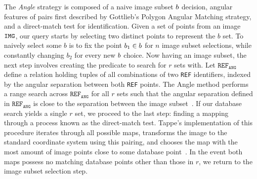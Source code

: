 The \textit{Angle} strategy is composed of a naive image subset $b$ decision, angular features of pairs first described by Gottlieb's Polygon Angular Matching strategy, and a direct-match test for identification.
Given a set of points from an image $\texttt{IMG}$, our query starts by selecting two distinct points to represent the $b$ set.
To naively select some $b$ is to fix the point $b_1 \in b$ for $n$ image subset selections, while constantly changing $b_2$ for every new $b$ choice.
Now having an image subset, the next step involves creating the predicate to search for $r$ sets with.
Let $\texttt{REF}_\texttt{ANG}$ define a relation holding tuples of all combinations of two \texttt{REF} identifiers, indexed by the angular separation between both \texttt{REF} points.
The Angle method performs a range search across $\texttt{REF}_\texttt{ANG}$ for all $r$ sets such that the angular separation defined in $\texttt{REF}_\texttt{ANG}$ is close to the separation between the image subset~\cite{bratt:analysisStarIdentification}.
If our database search yields a single $r$ set, we proceed to the last step: finding a mapping through a process known as the direct-match test.
Tappe's implementation of this procedure iterates through all possible maps, transforms the image to the standard coordinate system using this pairing, and chooses the map with the most amount of image points close to some database point~\cite{tappe:starTrackerDevelopment,needelman:stellarAttitudeAcquisition}.
In the event both maps possess no matching database points other than those in $r$, we return to the image subset selection step.


